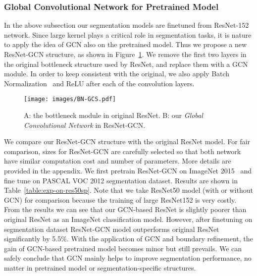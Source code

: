 \documentclass[10pt,twocolumn,letterpaper]{article}
\begin{document}
\subsubsection{Global Convolutional Network for Pretrained Model}
\label{subsubsec:gcn-pm}
	In the above subsection our segmentation models are finetuned from ResNet-152 network. Since large kernel plays a critical role in segmentation tasks, it is nature to apply the idea of GCN also on the pretrained model. Thus we propose a new ResNet-GCN structure, as shown in Figure~\ref{fig:bottleneck-GCSBM}. We remove the first two layers in the original bottleneck structure used by ResNet, and replace them with a GCN module. In order to keep consistent with the original, we also apply Batch Normalization~\cite{ioffe2015batch} and ReLU after each of the convolution layers. 
   \begin{figure}[h]
      \begin{center}
         \texttt{[image: images/BN-GCS.pdf]}
      \end{center}
      \caption{ A: the bottleneck module in original ResNet. B: our \emph{Global Convolutional Network} in ResNet-GCN. }
      \label{fig:bottleneck-GCSBM}
   \end{figure}
\par
	We compare our ResNet-GCN structure with the original ResNet model. For fair comparison, sizes for ResNet-GCN are carefully selected so that both network have similar computation cost and number of parameters. More details are provided in the appendix. We first pretrain ResNet-GCN on ImageNet 2015~\cite{ILSVRC15} and fine tune on PASCAL VOC 2012 segmentation dataset. Results are shown in Table~\ref{table:exp-on-res50sp}. Note that we take ResNet50 model (with or without GCN) for comparison because the training of large ResNet152 is very costly. From the results we can see that our GCN-based ResNet is slightly poorer than original ResNet as an ImageNet classification model. However, after finetuning on segmentation dataset ResNet-GCN model outperforms original ResNet significantly by 5.5\%. With the application of GCN and boundary refinement, the gain of GCN-based pretrained model becomes minor but still prevails. We can safely conclude that GCN mainly helps to improve segmentation performance, no matter in pretrained model or segmentation-specific structures.
\end{document}
